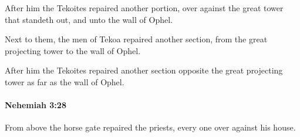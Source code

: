 			\begin{versebox}
					\item[BHS] 
					\item[LXX] 
					\item[ASV] After him the Tekoites repaired another portion, over against the great tower that standeth out, and unto the wall of Ophel.
					\item[NIV] Next to them, the men of Tekoa repaired another section, from the great projecting tower to the wall of Ophel.
					\item[NRSV] After him the Tekoites repaired another section opposite the great projecting tower as far as the wall of Ophel.
			\end{versebox}

		\paragraph{Nehemiah 3:28} %
			\label{NEHEMIAH-3-28}

			From above the horse gate repaired the priests, every one over against his house.

